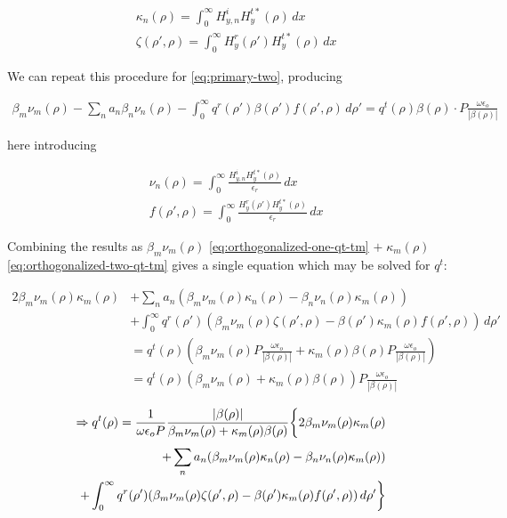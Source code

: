 \documentclass[11pt, oneside]{article}   	%
\begin{document}
\begin{align}
&\kappa_{n}(\rho) = \int_{0}^{\infty} H_{y,n}^{i} H_{y}^{t*}(\rho) \, dx\\
&\zeta (\rho ',\rho) = \int_{0}^{\infty} H_{y}^{r} (\rho ') H_{y}^{t*} (\rho) \, dx
\end{align}

We can repeat this procedure for \eqref{eq:primary-two}, producing

\begin{align}
\beta_{m} \nu_{m}(\rho)
- \sum_{n} a_{n} \beta_{n} \nu_{n}(\rho)
- \int_{0}^{\infty} q^{r} (\rho ') \beta (\rho ') f(\rho ',\rho) \, d\rho '
= q^{t}(\rho) \beta (\rho) \cdot P \frac{\omega \epsilon_{o}}{|\beta (\rho)|}
\label{eq:orthogonalized-two-qt-tm}
\end{align}

\noindent here introducing

\begin{align}
&\nu_{n}(\rho) = \int_{0}^{\infty} \frac{H_{y,n}^{i} H_{y}^{t*}(\rho)}{\epsilon_{r}} \, dx\\
&f(\rho ',\rho) = \int_{0}^{\infty} \frac{H_{y}^{r} (\rho ') H_{y}^{t*} (\rho)}{\epsilon_{r}} \, dx
\end{align}

Combining the results as $\beta_{m} \nu_{m} (\rho)$ \eqref{eq:orthogonalized-one-qt-tm} $ + \; \kappa_{m}(\rho)$ \eqref{eq:orthogonalized-two-qt-tm} gives a single equation which may be solved for $q^{t}$:

\begin{align}
2 \beta_{m} \nu_{m}(\rho) \kappa_{m}(\rho)
&+ \sum_{n} a_{n} (\beta_{m}\nu_{m}(\rho) \kappa_{n}(\rho) - \beta_{n}\nu_{n}(\rho) \kappa_{m}(\rho)) \nonumber \\
&+ \int_{0}^{\infty} q^{r} (\rho ') (\beta_{m}\nu_{m}(\rho)\zeta (\rho ',\rho) - \beta (\rho ')\kappa_{m}(\rho) f(\rho ',\rho)) \, d\rho ' \nonumber \\
&= q^{t}(\rho) (\beta_{m}\nu_{m}(\rho) P \frac{\omega \epsilon_{o}}{|\beta(\rho)|} + \kappa_{m}(\rho) \beta (\rho) P \frac{\omega \epsilon_{o}}{|\beta (\rho)|}) \nonumber \\
&= q^{t}(\rho) (\beta_{m}\nu_{m}(\rho) + \kappa_{m}(\rho)\beta (\rho)) P \frac{\omega \epsilon_{o}}{|\beta(\rho)|} \nonumber
\end{align}

\begin{equation}
\begin{split}
\Rightarrow
q^{t}(\rho) = 
\frac{1}{\omega \epsilon_{o} P} \frac{|\beta (\rho)|}{\beta_{m}\nu_{m}(\rho) + \kappa_{m}(\rho) \beta (\rho)}
\bigg\{2 \beta_{m} \nu_{m}(\rho) \kappa_{m}(\rho) \\
+ \sum_{n} a_{n} (\beta_{m}\nu_{m}(\rho) \kappa_{n}(\rho) - \beta_{n}\nu_{n}(\rho) \kappa_{m}(\rho)) \vphantom{\int_{0}^{\infty}} \\
+ \int_{0}^{\infty} q^{r} (\rho ') (\beta_{m}\nu_{m}(\rho)\zeta (\rho ',\rho) - \beta (\rho ')\kappa_{m}(\rho) f(\rho ',\rho)) \, d\rho ' \bigg\}
\end{split}
\end{equation}
\end{document}
